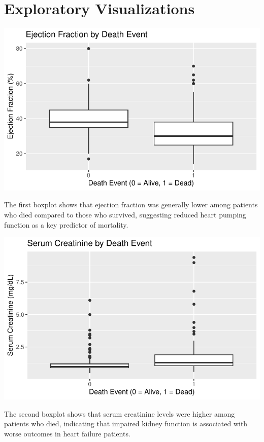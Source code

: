 \documentclass[
  letterpaper,
  DIV=11,
  numbers=noendperiod]{scrartcl}
\begin{document}
\hypertarget{exploratory-visualizations}{%
\section{Exploratory Visualizations}\label{exploratory-visualizations}}

\includegraphics{SDS-291-final-project_files/figure-pdf/unnamed-chunk-2-1.pdf}

The first boxplot shows that ejection fraction was generally lower among
patients who died compared to those who survived, suggesting reduced
heart pumping function as a key predictor of mortality.

\includegraphics{SDS-291-final-project_files/figure-pdf/unnamed-chunk-3-1.pdf}

The second boxplot shows that serum creatinine levels were higher among
patients who died, indicating that impaired kidney function is
associated with worse outcomes in heart failure patients.
\end{document}
